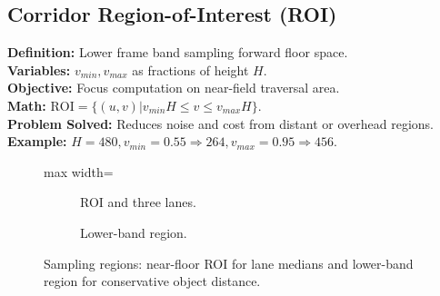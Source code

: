 \documentclass[11pt,a4paper]{article}
\begin{document}
\subsection{Corridor Region-of-Interest (ROI)}
\textbf{Definition:} Lower frame band sampling forward floor space.\\
\textbf{Variables:} $v_{min},v_{max}$ as fractions of height $H$.\\
\textbf{Objective:} Focus computation on near-field traversal area.\\
\textbf{Math:} $\mathrm{ROI}=\{(u,v)| v_{min}H\le v\le v_{max}H\}$.\\
\textbf{Problem Solved:} Reduces noise and cost from distant or overhead regions.\\
\textbf{Example:} $H=480, v_{min}=0.55 \Rightarrow 264, v_{max}=0.95 \Rightarrow 456$.\\

\begin{figure}[h]
    \centering
    \begin{adjustbox}{max width=\textwidth}
    \begin{subfigure}[b]{0.46\textwidth}
        \centering
        \caption{ROI and three lanes.}
    \end{subfigure}
    \hspace{1em}
    \begin{subfigure}[b]{0.46\textwidth}
        \centering
        \caption{Lower-band region.}
    \end{subfigure}
    \end{adjustbox}
    \caption{Sampling regions: near-floor ROI for lane medians and lower-band region for conservative object distance.}
    \label{fig:roi-lanes-lowerband}
\end{figure}
\end{document}
